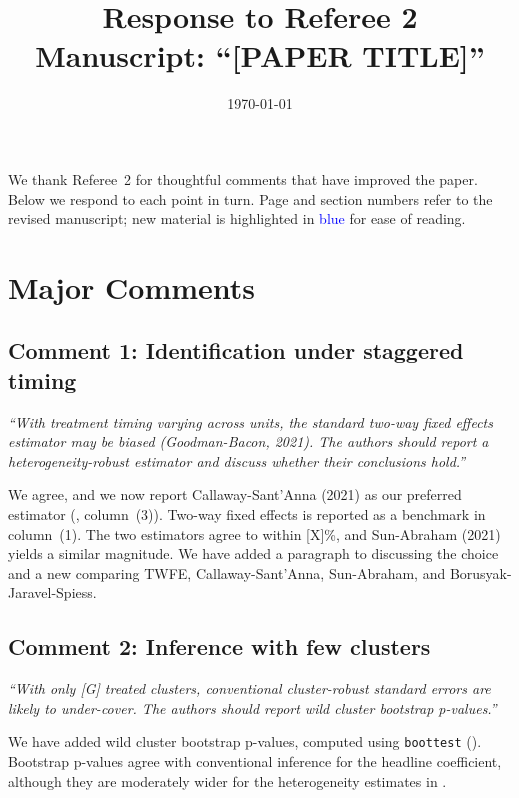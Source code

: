 \documentclass[11pt]{article}
\title{Response to Referee 2 \\
       \large Manuscript: ``[PAPER TITLE]''}
\date{\today}
\begin{document}
\maketitle

\noindent We thank Referee~2 for thoughtful comments that have improved
the paper. Below we respond to each point in turn. Page and section
numbers refer to the revised manuscript; new material is highlighted
in \textcolor{blue}{blue} for ease of reading.

\section*{Major Comments}

\subsection*{Comment 1: Identification under staggered timing}

\textit{``With treatment timing varying across units, the standard
two-way fixed effects estimator may be biased
(Goodman-Bacon, 2021). The authors should report a heterogeneity-robust
estimator and discuss whether their conclusions hold.''}

\medskip
\noindent We agree, and we now report Callaway-Sant'Anna (2021) as our
preferred estimator (, column~(3)). Two-way fixed effects
is reported as a benchmark in column~(1). The two estimators agree to
within [X]\%, and Sun-Abraham (2021) yields a similar magnitude. We have
added a paragraph to  discussing the choice and a new
 comparing TWFE, Callaway-Sant'Anna,
Sun-Abraham, and Borusyak-Jaravel-Spiess.

\subsection*{Comment 2: Inference with few clusters}

\textit{``With only [G] treated clusters, conventional cluster-robust
standard errors are likely to under-cover. The authors should report
wild cluster bootstrap p-values.''}

\medskip
\noindent We have added wild cluster bootstrap p-values, computed using
\texttt{boottest} (). Bootstrap p-values agree with
conventional inference for the headline coefficient, although they are
moderately wider for the heterogeneity estimates in .
\end{document}
